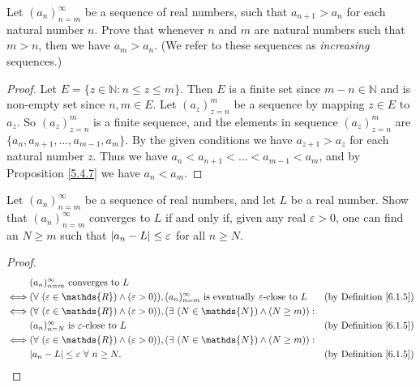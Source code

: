 \exercisesection

\begin{exercise}\label{ex 6.1.1}
Let \((a_n)_{n = m}^\infty\) be a sequence of real numbers, such that \(a_{n + 1} > a_n\) for each natural number \(n\).
Prove that whenever \(n\) and \(m\) are natural numbers such that \(m > n\), then we have \(a_m > a_n\).
(We refer to these sequences as \emph{increasing} sequences.)
\end{exercise}

\begin{proof}
Let \(E = \{z \in \mathds{N} : n \leq z \leq m\}\).
Then \(E\) is a finite set since \(m - n \in \mathds{N}\) and is non-empty set since \(n, m \in E\).
Let \((a_z)_{z = n}^m\) be a sequence by mapping \(z \in E\) to \(a_z\).
So \((a_z)_{z = n}^m\) is a finite sequence, and the elements in sequence \((a_z)_{z = n}^m\) are \(\{a_n, a_{n + 1}, \dots, a_{m - 1}, a_m\}\).
By the given conditions we have \(a_{z + 1} > a_z\) for each natural number \(z\).
Thus we have \(a_n < a_{n + 1} < \dots < a_{m - 1} < a_m\), and by Proposition \ref{5.4.7} we have \(a_n < a_m\).
\end{proof}

\begin{exercise}\label{ex 6.1.2}
Let \((a_n)_{n = m}^\infty\) be a sequence of real numbers, and let \(L\) be a real number.
Show that \((a_n)_{n = m}^\infty\) converges to \(L\) if and only if, given any real \(\varepsilon > 0\), one can find an \(N \geq m\) such that \(\abs*{a_n - L} \leq \varepsilon\) for all \(n \geq N\).
\end{exercise}

\begin{proof}
\begin{align*}
& (a_n)_{n = m}^\infty \text{ converges to } L \\
\iff & (\forall\ (\varepsilon \in \mathds{R}) \land (\varepsilon > 0)), (a_n)_{n = m}^\infty \text{ is eventually } \varepsilon\text{-close to } L & \text{(by Definition \ref{6.1.5})} \\
\iff & (\forall\ (\varepsilon \in \mathds{R}) \land (\varepsilon > 0)), (\exists\ (N \in \mathds{N}) \land (N \geq m)) : \\
& (a_n)_{n = N}^\infty \text{ is } \varepsilon\text{-close to } L & \text{(by Definition \ref{6.1.5})} \\
\iff & (\forall\ (\varepsilon \in \mathds{R}) \land (\varepsilon > 0)), (\exists\ (N \in \mathds{N}) \land (N \geq m)) : \\
& \abs*{a_n - L} \leq \varepsilon \ \forall\ n \geq N. & \text{(by Definition \ref{6.1.5})}
\end{align*}
\end{proof}


